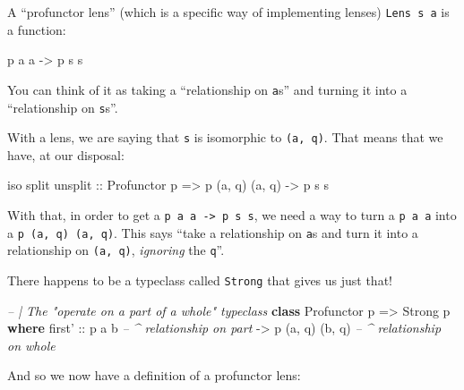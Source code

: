 \documentclass[]{article}
\newenvironment{Shaded}{}{}
\newcommand{\CommentTok}[1]{\textcolor[rgb]{0.38,0.63,0.69}{\textit{#1}}}
\newcommand{\DataTypeTok}[1]{\textcolor[rgb]{0.56,0.13,0.00}{#1}}
\newcommand{\KeywordTok}[1]{\textcolor[rgb]{0.00,0.44,0.13}{\textbf{#1}}}
\newcommand{\NormalTok}[1]{#1}
\newcommand{\OtherTok}[1]{\textcolor[rgb]{0.00,0.44,0.13}{#1}}
\begin{document}
A ``profunctor lens'' (which is a specific way of implementing lenses)
\texttt{Lens\textquotesingle{}\ s\ a} is a function:

\begin{Shaded}
\begin{Highlighting}[]
\NormalTok{p a a }\OtherTok{->}\NormalTok{ p s s}
\end{Highlighting}
\end{Shaded}

You can think of it as taking a ``relationship on \texttt{a}s'' and turning it
into a ``relationship on \texttt{s}s''.

With a lens, we are saying that \texttt{s} is isomorphic to \texttt{(a,\ q)}.
That means that we have, at our disposal:

\begin{Shaded}
\begin{Highlighting}[]
\NormalTok{iso split unsplit}
\OtherTok{    ::} \DataTypeTok{Profunctor}\NormalTok{ p}
    \OtherTok{=>}\NormalTok{ p (a, q) (a, q)}
    \OtherTok{->}\NormalTok{ p s s}
\end{Highlighting}
\end{Shaded}

With that, in order to get a \texttt{p\ a\ a\ -\textgreater{}\ p\ s\ s}, we need
a way to turn a \texttt{p\ a\ a} into a \texttt{p\ (a,\ q)\ (a,\ q)}. This says
``take a relationship on \texttt{a}s and turn it into a relationship on
\texttt{(a,\ q)}, \emph{ignoring} the \texttt{q}''.

There happens to be a typeclass called \texttt{Strong} that gives us just that!

\begin{Shaded}
\begin{Highlighting}[]
\CommentTok{-- | The "operate on a part of a whole" typeclass}
\KeywordTok{class} \DataTypeTok{Profunctor}\NormalTok{ p }\OtherTok{=>} \DataTypeTok{Strong}\NormalTok{ p }\KeywordTok{where}
\NormalTok{    first'}
\OtherTok{        ::}\NormalTok{ p a b                }\CommentTok{-- ^ relationship on part}
        \OtherTok{->}\NormalTok{ p (a, q) (b, q)      }\CommentTok{-- ^ relationship on whole}
\end{Highlighting}
\end{Shaded}

And so we now have a definition of a profunctor lens:
\end{document}
